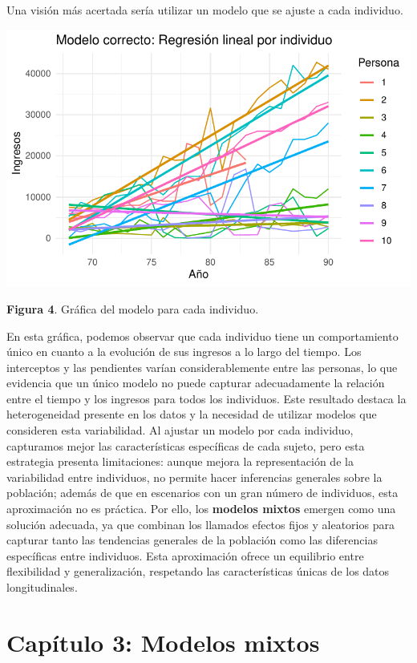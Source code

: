 \documentclass[
  letterpaper,
  DIV=11,
  numbers=noendperiod]{scrreprt}
\begin{document}
Una visión más acertada sería utilizar un modelo que se ajuste a cada
individuo.

\includegraphics{cap2_files/figure-pdf/unnamed-chunk-10-1.pdf}

\textbf{Figura 4}. Gráfica del modelo para cada individuo.

En esta gráfica, podemos observar que cada individuo tiene un
comportamiento único en cuanto a la evolución de sus ingresos a lo largo
del tiempo. Los interceptos y las pendientes varían considerablemente
entre las personas, lo que evidencia que un único modelo no puede
capturar adecuadamente la relación entre el tiempo y los ingresos para
todos los individuos. Este resultado destaca la heterogeneidad presente
en los datos y la necesidad de utilizar modelos que consideren esta
variabilidad. Al ajustar un modelo por cada individuo, capturamos mejor
las características específicas de cada sujeto, pero esta estrategia
presenta limitaciones: aunque mejora la representación de la
variabilidad entre individuos, no permite hacer inferencias generales
sobre la población; además de que en escenarios con un gran número de
individuos, esta aproximación no es práctica. Por ello, los
\textbf{modelos mixtos} emergen como una solución adecuada, ya que
combinan los llamados efectos fijos y aleatorios para capturar tanto las
tendencias generales de la población como las diferencias específicas
entre individuos. Esta aproximación ofrece un equilibrio entre
flexibilidad y generalización, respetando las características únicas de
los datos longitudinales.


\chapter{Capítulo 3: Modelos mixtos}\label{capuxedtulo-3-modelos-mixtos}
\end{document}
